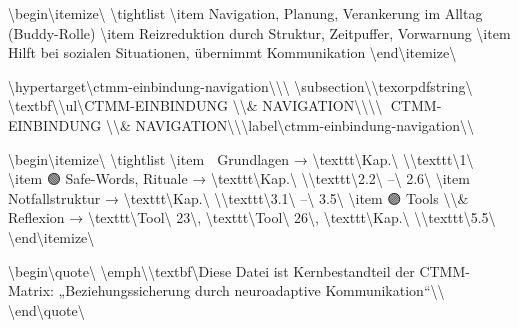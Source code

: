 \textbackslash{}begin\textbackslash{}{itemize\textbackslash{}}
\textbackslash{}tightlist
\textbackslash{}item
  Navigation, Planung, Verankerung im Alltag (Buddy-Rolle)
\textbackslash{}item
  Reizreduktion durch Struktur, Zeitpuffer, Vorwarnung
\textbackslash{}item
  Hilft bei sozialen Situationen, übernimmt Kommunikation
\textbackslash{}end\textbackslash{}{itemize\textbackslash{}}

\textbackslash{}hypertarget\textbackslash{}{ctmm-einbindung-navigation\textbackslash{}}\textbackslash{}{\textbackslash{}%
\textbackslash{}subsection\textbackslash{}{\textbackslash{}texorpdfstring\textbackslash{}{🧭 \textbackslash{}textbf\textbackslash{}{\textbackslash{}ul\textbackslash{}{CTMM-EINBINDUNG \textbackslash{}\textbackslash{}& NAVIGATION\textbackslash{}}\textbackslash{}}\textbackslash{}}\textbackslash{}{🧭 CTMM-EINBINDUNG \textbackslash{}\textbackslash{}& NAVIGATION\textbackslash{}}\textbackslash{}}\textbackslash{}label\textbackslash{}{ctmm-einbindung-navigation\textbackslash{}}\textbackslash{}}

\textbackslash{}begin\textbackslash{}{itemize\textbackslash{}}
\textbackslash{}tightlist
\textbackslash{}item
  🔵 Grundlagen → \textbackslash{}texttt\textbackslash{}{Kap.\textbackslash{} \textbackslash{}}\textbackslash{}texttt\textbackslash{}{1\textbackslash{}}
\textbackslash{}item
  🟢 Safe-Words, Rituale → \textbackslash{}texttt\textbackslash{}{Kap.\textbackslash{} \textbackslash{}}\textbackslash{}texttt\textbackslash{}{2.2\textbackslash{} –\textbackslash{} 2.6\textbackslash{}}
\textbackslash{}item
  🔴 Notfallstruktur → \textbackslash{}texttt\textbackslash{}{Kap.\textbackslash{} \textbackslash{}}\textbackslash{}texttt\textbackslash{}{3.1\textbackslash{} –\textbackslash{} 3.5\textbackslash{}}
\textbackslash{}item
  🟣 Tools \textbackslash{}\textbackslash{}& Reflexion → \textbackslash{}texttt\textbackslash{}{Tool\textbackslash{} 23\textbackslash{}}, \textbackslash{}texttt\textbackslash{}{Tool\textbackslash{} 26\textbackslash{}}, \textbackslash{}texttt\textbackslash{}{Kap.\textbackslash{} \textbackslash{}}\textbackslash{}texttt\textbackslash{}{5.5\textbackslash{}}
\textbackslash{}end\textbackslash{}{itemize\textbackslash{}}

\textbackslash{}begin\textbackslash{}{quote\textbackslash{}}
\textbackslash{}emph\textbackslash{}{\textbackslash{}textbf\textbackslash{}{Diese Datei ist Kernbestandteil der CTMM-Matrix: „Beziehungssicherung durch neuroadaptive Kommunikation``\textbackslash{}}\textbackslash{}}
\textbackslash{}end\textbackslash{}{quote\textbackslash{}}
